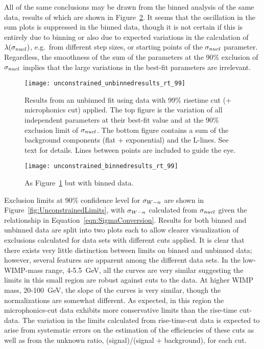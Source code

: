 All of the same conclusions may be drawn from the binned analysis of the same data, results of which are shown in Figure~\ref{fig:BinnedResultsNoConstrain}.  It seems that the oscillation in the sum plots is suppressed in the binned data, though it is not certain if this is entirely due to binning or also due to expected variations in the calculation of $\lambda(\sigma_{nucl})$, e.g.~from different step sizes, or starting points of the $\sigma_{nucl}$ parameter.  Regardless, the smoothness of the sum of the parameters at the 90\% exclusion of $\sigma_{nucl}$ implies that the large variations in the best-fit parameters are irrelevant.  
		\begin{sidewaysfigure}
			\centering				
			\texttt{[image: unconstrained\_unbinnedresults\_rt\_99]}				
			\caption{Results from an unbinned fit using data with 99\% risetime cut (+ microphonics cut) applied.
			The top figure is the variation of all independent parameters at their best-fit value and at the 90\% exclusion
			limit of $\sigma_{nucl}$.  The bottom figure contains a sum of the background components (flat + exponential) and
			the L-lines.  See text for details.  Lines between points are included to guide the eye.}
			\label{fig:UnbinnedResultsNoConstrain}
		\end{sidewaysfigure}
		\begin{sidewaysfigure}
			\centering				
			\texttt{[image: unconstrained\_binnedresults\_rt\_99]}				
			\caption{As Figure~\ref{fig:UnbinnedResultsNoConstrain} but with binned data.}
			\label{fig:BinnedResultsNoConstrain}
		\end{sidewaysfigure}
Exclusion limits at 90\% confidence level for $\sigma_{W-n}$ are shown in Figure~\ref{fig:UnconstrainedLimits}, with $\sigma_{W-n}$ calculated from $\sigma_{nucl}$ given the relationship in Equation~\ref{eqn:SigmaConversion}.  Results for both binned and unbinned data are split into two plots each to allow clearer visualization of exclusions calculated for data sets with different cuts applied.  
It is clear that there exists very little distinction between limits on binned and unbinned data; however, several features are apparent among the different data sets.  In the low-WIMP-mass range, 4-5.5~GeV, all the curves are very similar suggesting the limits in this small region are robust against cuts to the data.  At higher WIMP mass, 20-100~GeV, the slope of the curves is very similar, though the normalizations are somewhat different.  As expected, in this region the microphonics-cut data exhibits more conservative limits than the rise-time cut-data.  The variation in the limits calculated from rise-time-cut data is expected to arise from systematic errors on the estimation of the efficiencies of these cuts as well as from the unknown ratio, (signal)/(signal + background), for each cut.  

